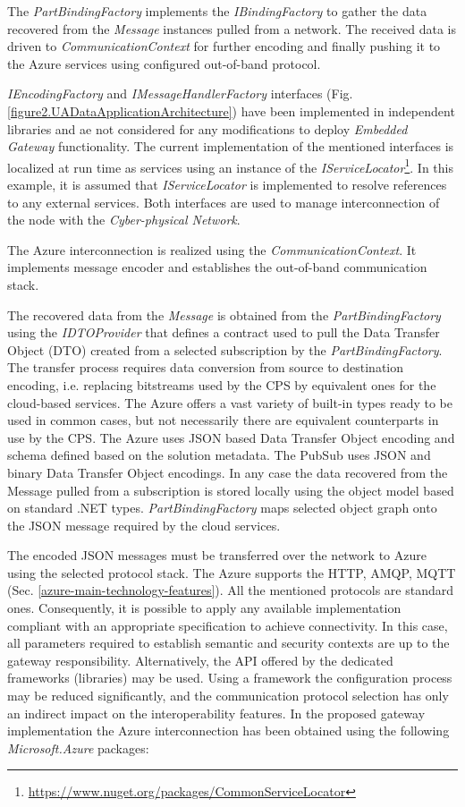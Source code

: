 \documentclass{article}
\begin{document}
The \textit{PartBindingFactory} implements the \textit{IBindingFactory} to gather the data recovered from the \emph{Message} instances pulled from a network. The received data is driven to \textit{CommunicationContext} for further encoding and finally pushing it to the Azure services using configured out-of-band protocol.

\textit{IEncodingFactory} and \textit{IMessageHandlerFactory} interfaces (Fig. \ref*{figure2.UADataApplicationArchitecture}) have been implemented in independent libraries and ae not considered for any modifications to deploy \textit{Embedded Gateway} functionality. The current implementation of the mentioned interfaces is localized at run time as services using an instance of the \textit{IServiceLocator}\footnote{ \url{https://www.nuget.org/packages/CommonServiceLocator} }. In this example, it is assumed that \textit{IServiceLocator} is implemented to resolve references to any external services. Both interfaces are used to manage interconnection of the node with the \textit{Cyber-physical Network}.

The Azure interconnection is realized using the \textit{CommunicationContext}. It implements message encoder and establishes the out-of-band communication stack.

The recovered data from the \textit{Message} is obtained from the \textit{PartBindingFactory} using the \textit{IDTOProvider} that defines a contract used to pull the Data Transfer Object (DTO) created from a selected subscription by the \textit{PartBindingFactory}. The transfer process requires data conversion from source to destination encoding, i.e. replacing bitstreams used by the CPS by equivalent ones for the cloud-based services. The Azure offers a vast variety of built-in types ready to be used in common cases, but not necessarily there are equivalent counterparts in use by the CPS. The Azure uses JSON based Data Transfer Object encoding and schema defined based on the solution metadata. The PubSub uses JSON and binary Data Transfer Object encodings. In any case the data recovered from the Message pulled from a subscription is stored locally using the object model based on standard .NET types. \textit{PartBindingFactory} maps selected object graph onto the JSON message required by the cloud services.

The encoded JSON messages must be transferred over the network to Azure using the selected protocol stack. The Azure supports the HTTP, AMQP, MQTT (Sec. \ref*{azure-main-technology-features}). All the mentioned protocols are standard ones. Consequently, it is possible to apply any available implementation compliant with an appropriate specification to achieve connectivity. In this case, all parameters required to establish semantic and security contexts are up to the gateway responsibility. Alternatively, the API offered by the dedicated frameworks (libraries) may be used. Using a framework the configuration process may be reduced significantly, and the communication protocol selection has only an indirect impact on the interoperability features. In the proposed gateway implementation the Azure interconnection has been obtained using the following \textit{Microsoft.Azure} packages:
\end{document}
